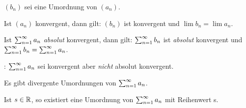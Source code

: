 \documentclass[a4paper,oneside,DIV15,BCOR12mm]{scrbook}
\begin{document}
\begin{satz}
$(b_n)$ sei eine Umordnung von $(a_n)$.
\begin{liste}
\item Ist $(a_n)$ konvergent, dann gilt: $(b_n)$ ist konvergent und $\lim{b_n} = \lim{a_n}$.

\item Ist $\sum_{n=1}^{\infty}{a_n}$ \emph{absolut} konvergent, dann gilt: $\sum_{n=1}^{\infty}{b_n}$ ist \emph{absolut} konvergent und $\sum_{n=1}^{\infty}{b_n} = \sum_{n=1}^{\infty}{a_n}$.

\item {}: $\sum_{n=1}^{\infty}{a_n}$ sei konvergent aber \emph{nicht} absolut konvergent.
\begin{liste}
\item Es gibt divergente Umordnungen von $\sum_{n=1}^{\infty}{a_n}$.
\item Ist $s\in\mathbb{R}$, so existiert eine Umordnung von $\sum_{n=1}^{\infty}{a_n}$ mit Reihenwert s.
\end{liste}
\end{liste}
\end{satz}
\end{document}
